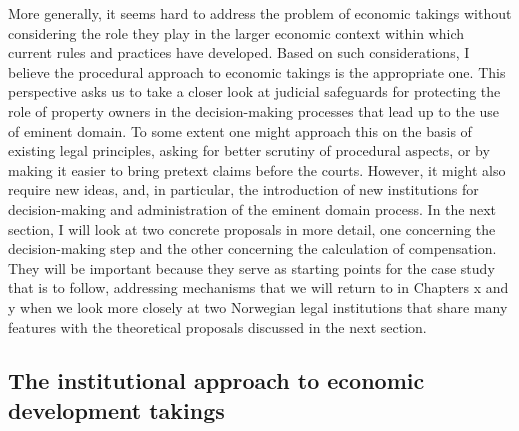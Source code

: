 More generally, it seems hard to address the problem of economic takings without considering the role they play in the larger economic context within which current rules and practices have developed. Based on such considerations, I believe the procedural approach to economic takings is the appropriate one. This perspective asks us to take a closer look at judicial safeguards for protecting the role of property owners in the decision-making processes that lead up to the use of eminent domain. To some extent one might approach this on the basis of existing legal principles, asking for better scrutiny of procedural aspects, or by making it easier to bring pretext claims before the courts. However, it might also require new ideas, and, in particular, the introduction of new institutions for decision-making and administration of the eminent domain process. In the next section, I will look at two concrete proposals in more detail, one concerning the decision-making step and the other concerning the calculation of compensation. 
They will be important because they serve as starting points for the case study that is to follow, addressing mechanisms that we will return to in Chapters x and y when we look more closely at two Norwegian legal institutions that share many features with the theoretical proposals discussed in the next section.

\subsection{The institutional approach to economic development takings}

